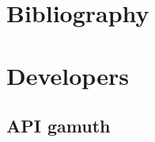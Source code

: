 \documentclass[letterpaper,10pt,english]{sphinxmanual}
\begin{document}
\chapter{Bibliography}
\label{\detokenize{8_bibliography:bibliography}}\label{\detokenize{8_bibliography::doc}}
\sphinxAtStartPar



\chapter{Developers}
\label{\detokenize{index:developers}}

\section{API \sphinxhyphen{} gamuth}
\label{\detokenize{api:module-gamuth}}\label{\detokenize{api:api-gamuth}}\label{\detokenize{api:api}}\label{\detokenize{api::doc}}
\end{document}
